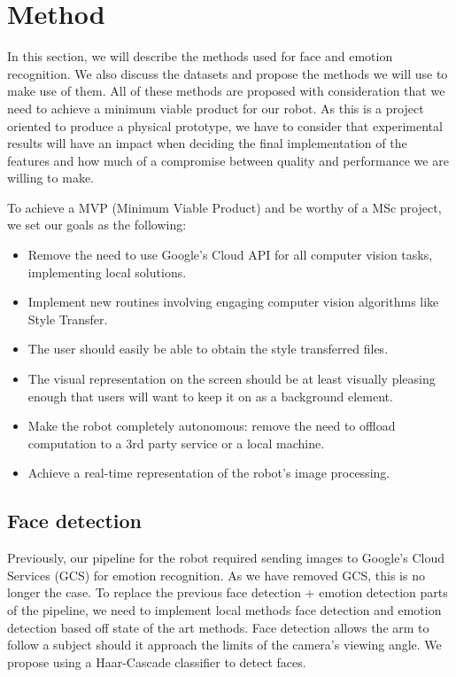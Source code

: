 
\section{Method}

In this section, we will describe the methods used for face and emotion recognition. We also discuss the datasets and propose the methods we will use to make use of them. All of these methods are proposed with consideration that we need to achieve a minimum viable product for our robot. As this is a project oriented to produce a physical prototype, we have to consider that experimental results will have an impact when deciding the final implementation of the features and how much of a compromise between quality and performance we are willing to make. 


To achieve a MVP (Minimum Viable Product) and be worthy of a MSc project, we set our goals as the following:
\begin{itemize}
  \item Remove the need to use Google's Cloud API for all computer vision tasks, implementing local solutions.
  \item Implement new routines involving engaging computer vision algorithms like Style Transfer.
  \item The user should easily be able to obtain the style transferred files.
  \item The visual representation on the screen should be at least visually pleasing enough that users will want to keep it on as a background element.
  \item Make the robot completely autonomous: remove the need to offload computation to a 3rd party service or a local machine.
  \item Achieve a real-time representation of the robot's image processing.
\end{itemize}

\subsection{Face detection}

Previously, our pipeline for the robot required sending images to Google's Cloud Services (GCS) for emotion recognition. As we have removed GCS, this is no longer the case. To replace the previous face detection + emotion detection parts of the pipeline, we need to implement local methods face detection and emotion detection based off state of the art methods. Face detection allows the arm to follow a subject should it approach the limits of the camera's viewing angle. We propose using a Haar-Cascade classifier to detect faces. 

